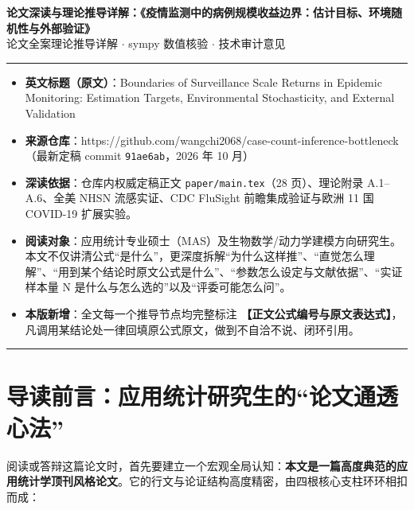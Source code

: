 \documentclass[11pt,a4paper]{ctexart}
\begin{document}
\begin{center}
{\LARGE\textbf{论文深读与理论推导详解：《疫情监测中的病例规模收益边界：估计目标、环境随机性与外部验证》}}\\[0.8em]
{\large\color{gray} 论文全案理论推导详解 $\cdot$ sympy 数值核验 $\cdot$ 技术审计意见}\\[1.2em]
\end{center}
{\hypersetup{linkcolor=black}\tableofcontents}
\vspace{1.5em}\hrule\vspace{1.5em}

\begin{itemize}[leftmargin=2em, itemsep=2pt, parsep=0pt]
\item \textbf{英文标题（原文）}：Boundaries of Surveillance Scale Returns in Epidemic Monitoring: Estimation Targets, Environmental Stochasticity, and External Validation
\item \textbf{来源仓库}：https://github.com/wangchi2068/case-count-inference-bottleneck （最新定稿 commit \texttt{91ae6ab}，2026 年 10 月）
\item \textbf{深读依据}：仓库内权威定稿正文 \texttt{paper/main.tex}（28 页）、理论附录 A.1–A.6、全美 NHSN 流感实证、CDC FluSight 前瞻集成验证与欧洲 11 国 COVID-19 扩展实验。
\item \textbf{阅读对象}：应用统计专业硕士（MAS）及生物数学/动力学建模方向研究生。本文不仅讲清公式“是什么”，更深度拆解“为什么这样推”、“直觉怎么理解”、“用到某个结论时原文公式是什么”、“参数怎么设定与文献依据”、“实证样本量 N 是什么与怎么选的”以及“评委可能怎么问”。
\item \textbf{本版新增}：全文每一个推导节点均完整标注 \textbf{【正文公式编号与原文表达式】}，凡调用某结论处一律回填原公式原文，做到不自洽不说、闭环引用。
\end{itemize}

\vspace{0.8em}\hrule\vspace{0.8em}

\section{导读前言：应用统计研究生的“论文通透心法”}

阅读或答辩这篇论文时，首先要建立一个宏观全局认知：\textbf{本文是一篇高度典范的应用统计学顶刊风格论文}。它的行文与论证结构高度精密，由四根核心支柱环环相扣而成：
\end{document}
